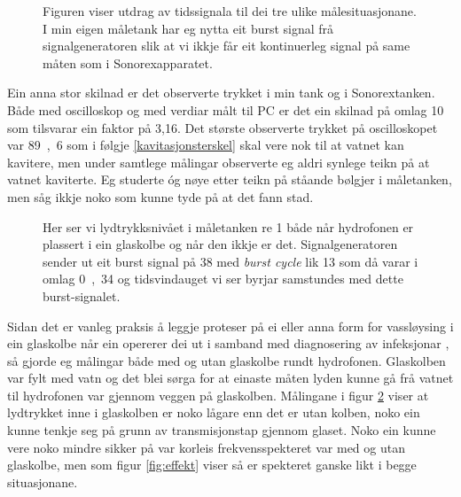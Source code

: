 \begin{figure}[htbp]
	\begin{center}
	\end{center}
	\caption[Tidssignala til dei ulike målingane]{Figuren viser utdrag av tidssignala til dei tre ulike målesituasjonane. I min eigen måletank har eg nytta eit burst 	signal frå signalgeneratoren slik at vi ikkje får eit kontinuerleg signal på same måten som i Sonorexapparatet.}
	\label{fig:tidssignal}
\end{figure}

Ein anna stor skilnad er det observerte trykket i min tank og i Sonorextanken. Både med oscilloskop og med verdiar målt til PC er det ein skilnad på omlag \unit{10}{\deci\bel} som tilsvarar ein faktor på 3,16. Det største observerte trykket på oscilloskopet var \unit{89,6}{\kilo\pascal} som i følgje \eqref{kavitasjonsterskel} skal vere nok til at vatnet kan kavitere, men under samtlege målingar observerte eg aldri synlege teikn på at vatnet kaviterte. Eg studerte óg nøye etter teikn på ståande bølgjer i måletanken, men såg ikkje noko som kunne tyde på at det fann stad.

\begin{figure}[htbp]
	\centering
	\caption[Lydtrykksnivå i måletanken]{Her ser vi lydtrykksnivået i måletanken re \unit{1}{\micro\pascal} både når hydrofonen er plassert i ein glaskolbe og 	når den ikkje er det. Signalgeneratoren sender ut eit burst signal på \unit{38}{\kilo\hertz} med \emph{burst cycle} lik 13 som då varar i omlag \unit{0,34}{\milli	\second} og tidsvindauget vi ser byrjar samstundes med dette burst-signalet.}
	\label{fig:trykk}
\end{figure}

Sidan det er vanleg praksis å leggje proteser på ei eller anna form for vassløysing i ein glaskolbe når ein opererer dei ut i samband med diagnosering av infeksjonar \cite{ultraprotese}, så gjorde eg målingar både med og utan glaskolbe rundt hydrofonen. Glaskolben var fylt med vatn og det blei sørga for at einaste måten lyden kunne gå frå vatnet til hydrofonen var gjennom veggen på glaskolben. Målingane i figur \ref{fig:trykk} viser at lydtrykket inne i glaskolben er noko lågare enn det er utan kolben, noko ein kunne tenkje seg på grunn av transmisjonstap gjennom glaset. Noko ein kunne vere noko mindre sikker på var korleis frekvensspekteret var med og utan glaskolbe, men som figur \ref{fig:effekt} viser så er spekteret ganske likt i begge situasjonane.

